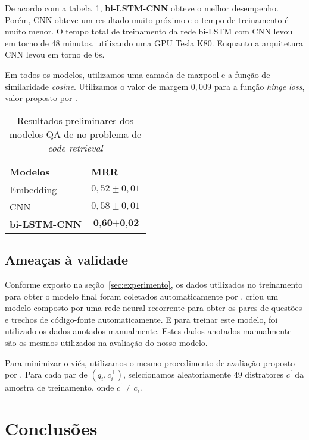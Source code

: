 \documentclass[12pt]{article}
\begin{document}
De acordo com a tabela~\ref{table:resultados-preliminares}, \textbf{bi-LSTM-CNN} obteve o melhor desempenho. Porém, CNN obteve um resultado muito próximo e o tempo de treinamento é muito menor. O tempo total de treinamento da rede bi-LSTM com CNN levou em torno de 48 minutos, utilizando uma GPU Tesla K80. Enquanto a arquitetura CNN levou em torno de 6s. 

Em todos os modelos, utilizamos uma camada de maxpool e a função de similaridade \textit{cosine}. Utilizamos o valor de margem $0,009$ para a função \textit{hinge loss}, valor proposto por \cite{feng-answer-selection-2015}.


\begin{table}[h]
\centering
\begin{tabular}{ |p{3cm}|p{3cm}|  }
 \hline
 \textbf{Modelos} & \textbf{MRR}\\
 \hline
 Embedding & $0,52 \pm 0,01$\\
 \hline
 CNN & $0,58 \pm 0,01 $ \\
 \hline
 \textbf{bi-LSTM-CNN} & $\textbf{0,60} \pm \textbf{0,02}$\\
 \hline
\end{tabular}
\caption{Resultados preliminares dos modelos QA de \cite{tan-lstm-qa} no problema de \textit{code retrieval}}
\label{table:resultados-preliminares}
\end{table}

\subsection{Ameaças à validade}

Conforme exposto na seção~\ref{sec:experimento}, os dados utilizados no treinamento para obter o modelo final foram coletados automaticamente por \cite{Yao-staqc:2018}. \cite{Yao-staqc:2018} criou um modelo composto por uma rede neural recorrente para obter os pares de questões e trechos de código-fonte automaticamente. E para treinar este modelo, foi utilizado os dados anotados manualmente. Estes dados anotados manualmente são os mesmos utilizados na avaliação do nosso modelo. 

Para minimizar o viés, utilizamos o mesmo procedimento de avaliação proposto por \cite{iyer-etal-2016-summarizing}. Para cada par de $(q_{i}, c_{i}^{+})$, selecionamos aleatoriamente 49 distratores $c^{'}$ da amostra de treinamento, onde $c^{'} \neq c_{i}$. 

\section{Conclusões}
\end{document}

